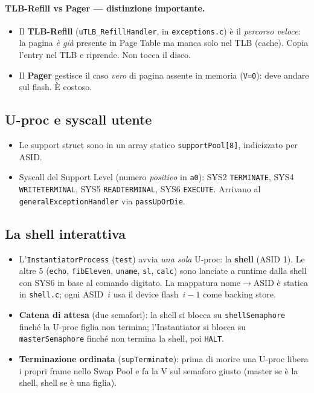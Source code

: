 \documentclass[11pt,a4paper]{article}
\newcommand{\code}[1]{\texttt{#1}}
\begin{document}
\paragraph{TLB-Refill vs Pager --- distinzione importante.}
\begin{itemize}
\item Il \textbf{TLB-Refill} (\code{uTLB\_RefillHandler}, in
  \code{exceptions.c}) è il \emph{percorso veloce}: la pagina \emph{è già}
  presente in Page Table ma manca solo nel TLB (cache). Copia l'entry nel TLB
  e riprende. Non tocca il disco.
\item Il \textbf{Pager} gestisce il caso \emph{vero} di pagina assente in
  memoria (\code{V=0}): deve andare sul flash. È costoso.
\end{itemize}

\subsection{U-proc e syscall utente}
\begin{itemize}
\item Le support struct sono in un array statico \code{supportPool[8]},
  indicizzato per ASID.
\item Syscall del Support Level (numero \emph{positivo} in \code{a0}): SYS2
  \code{TERMINATE}, SYS4 \code{WRITETERMINAL}, SYS5 \code{READTERMINAL}, SYS6
  \code{EXECUTE}. Arrivano al \code{generalExceptionHandler} via
  \code{passUpOrDie}.
\end{itemize}

\subsection{La shell interattiva}
\begin{itemize}
\item L'\code{InstantiatorProcess} (\code{test}) avvia \emph{una sola} U-proc:
  la \textbf{shell} (ASID 1). Le altre 5 (\code{echo}, \code{fibEleven},
  \code{uname}, \code{sl}, \code{calc}) sono lanciate a runtime dalla shell con
  SYS6 in base al comando digitato. La mappatura nome$\to$ASID è statica in
  \code{shell.c}; ogni ASID~$i$ usa il device flash~$i-1$ come backing store.
\item \textbf{Catena di attesa} (due semafori): la shell si blocca su
  \code{shellSemaphore} finché la U-proc figlia non termina; l'Instantiator si
  blocca su \code{masterSemaphore} finché non termina la shell, poi
  \code{HALT}.
\item \textbf{Terminazione ordinata} (\code{supTerminate}): prima di morire una
  U-proc libera i propri frame nello Swap Pool e fa la V sul semaforo giusto
  (master se è la shell, shell se è una figlia).
\end{itemize}
\end{document}
